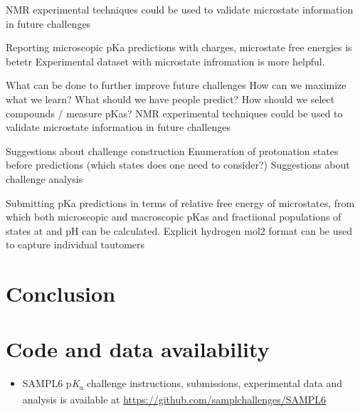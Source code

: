 \documentclass[9pt,lineno,final]{elife}
\newcommand{\pKa}{p\textit{K}\textsubscript{a}}
\begin{document}

NMR experimental techniques could be used to validate microstate information in future challenges

Reporting microscopic pKa predictions with charges, microstate free energies is betetr
Experimental dataset with microstate infromation is more helpful.

What can be done to further improve future challenges
How can we maximize what we learn?
What should we have people predict?
How should we select compounds / measure pKas? NMR experimental techniques could be used to validate microstate information in future challenges

Suggestions about challenge construction
Enumeration of protonation states before predictions (which states does one need to consider?)
Suggestions about challenge analysis


Submitting pKa predictions in terms of relative free energy of microstates, from which both microscopic and macroscopic pKas and fractiional populations of states at and pH can be calculated.
Explicit hydrogen mol2 format can be used to capture individual tautomers















\section{Conclusion}


\section{Code and data availability} \label{Code-and-Data-Availability}
\begin{minipage}{15cm}
\begin{itemize}

\item SAMPL6 \pKa{} challenge instructions, submissions, experimental data and analysis is available at  \href{https://github.com/samplchallenges/SAMPL6}{https://github.com/samplchallenges/SAMPL6}

\end{itemize}
\end{minipage}
\end{document}
